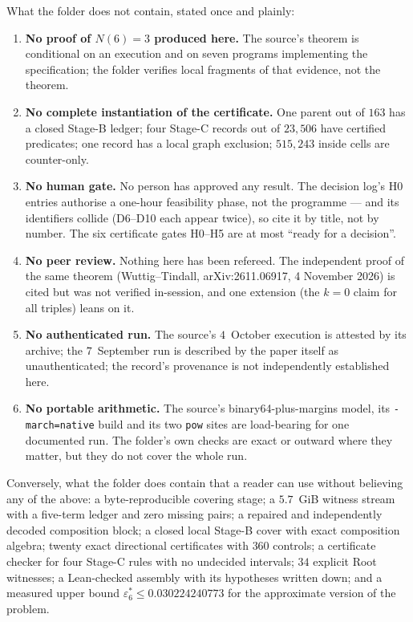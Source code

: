 \documentclass[10pt]{article}
\theoremstyle{definition}
\begin{document}
What the folder does not contain, stated once and plainly:
\begin{enumerate}[label=(\alph*),leftmargin=1.8em,itemsep=1pt]
\item \textbf{No proof of $N(6)=3$ produced here.} The source's theorem is conditional on an execution
and on seven programs implementing the specification; the folder verifies local fragments of that
evidence, not the theorem.
\item \textbf{No complete instantiation of the certificate.} One parent out of $163$ has a closed
Stage-B ledger; four Stage-C records out of $23{,}506$ have certified predicates; one record has a
local graph exclusion; $515{,}243$ inside cells are counter-only.
\item \textbf{No human gate.} No person has approved any result. The decision log's H0 entries authorise a
one-hour feasibility phase, not the programme --- and its identifiers collide (D6--D10 each appear
twice), so cite it by title, not by number. The six certificate gates H0--H5 are at most ``ready for a
decision''.
\item \textbf{No peer review.} Nothing here has been refereed. The independent proof of the same
theorem (Wuttig--Tindall, arXiv:2611.06917, 4 November 2026) is cited but was not verified in-session,
and one extension (the $k=0$ claim for all triples) leans on it.
\item \textbf{No authenticated run.} The source's $4$~October execution is attested by its archive;
the $7$~September run is described by the paper itself as unauthenticated; the record's provenance is
not independently established here.
\item \textbf{No portable arithmetic.} The source's binary64-plus-margins model, its
\texttt{-march=native} build and its two \texttt{pow} sites are load-bearing for one documented run.
The folder's own checks are exact or outward where they matter, but they do not cover the whole run.
\end{enumerate}

Conversely, what the folder does contain that a reader can use without believing any of the above:
a byte-reproducible covering stage; a $5.7$~GiB witness stream with a five-term ledger and zero
missing pairs; a repaired and independently decoded composition block; a closed local Stage-B cover
with exact composition algebra; twenty exact directional certificates with $360$ controls; a
certificate checker for four Stage-C rules with no undecided intervals; $34$ explicit Root witnesses;
a Lean-checked assembly with its hypotheses written down; and a measured upper bound
$\varepsilon_6^*\le0.030224240773$ for the approximate version of the problem.
\end{document}
